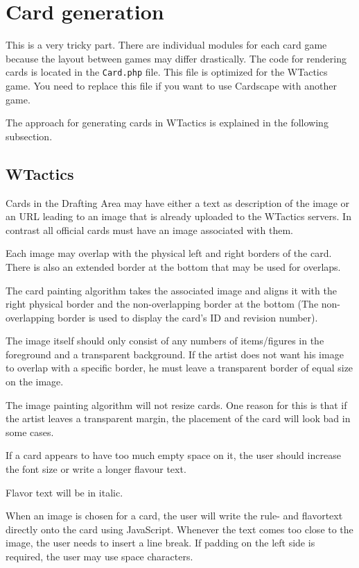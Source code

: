\documentclass[a4paper, 11pt]{scrbook}
\begin{document}
\section{Card generation}
This is a very tricky part. There are individual modules for each card game because the layout between games may differ drastically. The code for rendering cards is located in the \texttt{Card.php} file. This file is optimized for the WTactics game. You need to replace this file if you want to use Cardscape with another game.

The approach for generating cards in WTactics is explained in the following subsection.

\subsection{WTactics}
Cards in the Drafting Area may have either a text as description of the image or an URL leading to an image that is already uploaded to the WTactics servers. In contrast all official cards must have an image associated with them.

Each image may overlap with the physical left and right borders of the card. There is also an extended border at the bottom that may be used for overlaps.

The card painting algorithm takes the associated image and aligns it with the right physical border and  the non-overlapping border at the bottom (The non-overlapping border is used to display the card's ID and revision number).

The image itself should only consist of any numbers of items/figures in the foreground and a transparent background. If the artist does not want his image to overlap with a specific border, he must leave a transparent border of equal size on the image.

The image painting algorithm will not resize cards. One reason for this is that if the artist leaves a transparent margin, the placement of the card will look bad in some cases.

If a card appears to have too much empty space on it, the user should increase the font size or write a longer flavour text.

Flavor text will be in italic.

When an image is chosen for a card, the user will write the rule- and flavortext directly onto the card using JavaScript. Whenever the text comes too close to the image, the user needs to insert a line break. If padding on the left side is required, the user may use space characters.
\end{document}
